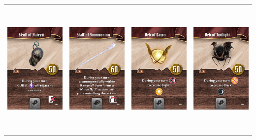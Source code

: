 \documentclass{minimal}
\begin{document}
{\begin{longtable}{llll}
\includegraphics[width=44mm,height=68mm]{./64-151/gh-119-skull-of-hatred.png} &
\includegraphics[width=44mm,height=68mm]{./64-151/gh-120-staff-of-summoning.png} &
\includegraphics[width=44mm,height=68mm]{./64-151/gh-121-orb-of-dawn.png} &
\includegraphics[width=44mm,height=68mm]{./64-151/gh-122-orb-of-twilight.png}\\ 

\end{longtable}}
\end{document}
